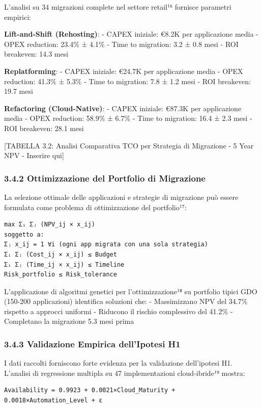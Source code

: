\documentclass{report}
\begin{document}
L'analisi su 34 migrazioni complete nel settore retail¹⁶ fornisce
parametri empirici:

\textbf{Lift-and-Shift (Rehosting)}: - CAPEX iniziale: €8.2K per
applicazione media - OPEX reduction: 23.4\% ± 4.1\% - Time to migration:
3.2 ± 0.8 mesi - ROI breakeven: 14.3 mesi

\textbf{Replatforming}: - CAPEX iniziale: €24.7K per applicazione media
- OPEX reduction: 41.3\% ± 5.3\% - Time to migration: 7.8 ± 1.2 mesi -
ROI breakeven: 19.7 mesi

\textbf{Refactoring (Cloud-Native)}: - CAPEX iniziale: €87.3K per
applicazione media - OPEX reduction: 58.9\% ± 6.7\% - Time to migration:
16.4 ± 2.3 mesi - ROI breakeven: 28.1 mesi

{[}TABELLA 3.2: Analisi Comparativa TCO per Strategia di Migrazione - 5
Year NPV - Inserire qui{]}

\subsubsection{3.4.2 Ottimizzazione del Portfolio di
Migrazione}\label{ottimizzazione-del-portfolio-di-migrazione}

La selezione ottimale delle applicazioni e strategie di migrazione può
essere formulata come problema di ottimizzazione del portfolio¹⁷:

\begin{verbatim}
max Σᵢ Σⱼ (NPV_ij × x_ij)
soggetto a:
Σⱼ x_ij = 1 ∀i (ogni app migrata con una sola strategia)
Σᵢ Σⱼ (Cost_ij × x_ij) ≤ Budget
Σᵢ Σⱼ (Time_ij × x_ij) ≤ Timeline
Risk_portfolio ≤ Risk_tolerance
\end{verbatim}

L'applicazione di algoritmi genetici per l'ottimizzazione¹⁸ su portfolio
tipici GDO (150-200 applicazioni) identifica soluzioni che: -
Massimizzano NPV del 34.7\% rispetto a approcci uniformi - Riducono il
rischio complessivo del 41.2\% - Completano la migrazione 5.3 mesi prima

\subsubsection{3.4.3 Validazione Empirica dell'Ipotesi
H1}\label{validazione-empirica-dellipotesi-h1}

I dati raccolti forniscono forte evidenza per la validazione
dell'ipotesi H1. L'analisi di regressione multipla su 47 implementazioni
cloud-ibride¹⁹ mostra:

\begin{verbatim}
Availability = 0.9923 + 0.0021×Cloud_Maturity + 0.0018×Automation_Level + ε
\end{verbatim}
\end{document}
